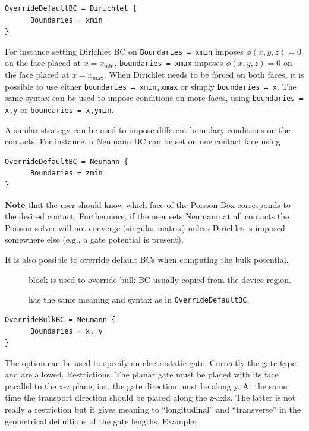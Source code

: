 \begin{verbatim}
OverrideDefaultBC = Dirichlet {
      Boundaries = xmin
}
\end{verbatim}

For instance setting Dirichlet BC on \verb|Boundaries = xmin| imposes
$\phi(x,y,z)=0$ on the face placed at $x=x_{\text{min}}$,
\verb|boundaries = xmax| imposes $\phi(x,y,z)=0$ on the face placed at
$x=x_{\text{max}}$. When Dirichlet needs to be forced on both faces, it is
possible to use either \verb|boundaries = xmin,xmax| or simply
\verb|boundaries = x|. The same syntax can be used to impose conditions on more
faces, using \verb|boundaries = x,y| or \verb|boundaries = x,ymin|.

A similar strategy can be used to impose different boundary conditions on the
contacts. For instance, a Neumann BC can be set on one contact face using

\begin{verbatim}
OverrideDefaultBC = Neumann {
      Boundaries = zmin
}
\end{verbatim}

{\bf Note} that the user should know which face of the Poisson Box corresponds
to the desired contact. Furthermore, if the user sets Neumann at all contacts
the Poisson solver will not converge (singular matrix) unless Dirichlet is
imposed somewhere else (e.g., a gate potential is present).

It is also possible to override default BCs when computing the bulk potential.

\begin{description}
\item[] block is used to override bulk BC usually copied from
  the device region.
\item[] has the same meaning and syntax as in
  \verb|OverrideDefaultBC|.
\end{description}


\begin{verbatim}
OverrideBulkBC = Neumann {
      Boundaries = x, y
}
\end{verbatim}




The option  can be used to specify an electrostatic gate. Currently the
gate type  and  are allowed.  Restrictions. The
planar gate must be placed with its face parallel to the x-z plane, i.e., the
gate direction must be along y. At the same time the transport direction should
be placed along the z-axis. The latter is not really a restriction but it gives
meaning to ``longitudinal'' and ``transverse'' in the geometrical definitions of
the gate lengths.  Example:

